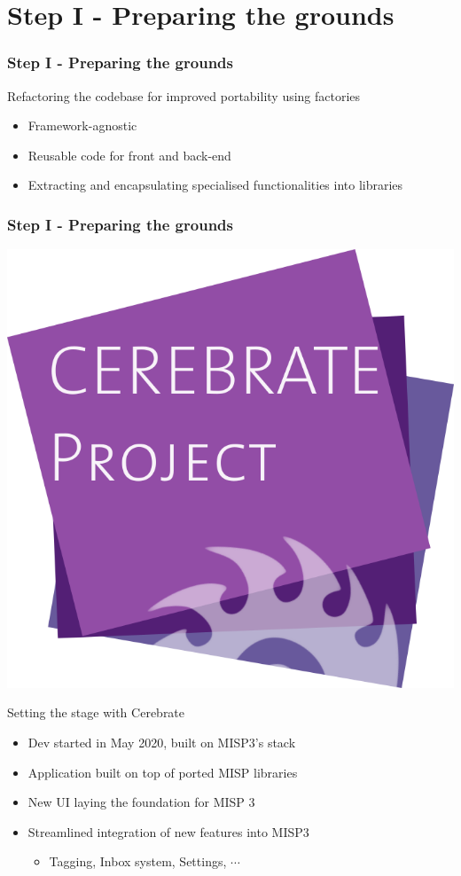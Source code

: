 \section{Step I - Preparing the grounds}
\begin{frame}
    \frametitle{Step I - Preparing the grounds}
    Refactoring the codebase for improved portability using factories
    \begin{itemize}
        \item Framework-agnostic
        \item Reusable code for front and back-end
        \item Extracting and encapsulating specialised functionalities into libraries
    \end{itemize}
\end{frame}


\begin{frame}
    \frametitle{Step I - Preparing the grounds}
    \vspace{-2em}
    \begin{center}
        \includegraphics[width=0.2\linewidth]{pictures/cerebrate.png}
    \end{center}
    Setting the stage with Cerebrate
    \begin{itemize}
        \item Dev started in May 2020, built on MISP3's stack
        \item Application built on top of ported MISP libraries
        \item New UI laying the foundation for MISP 3
        \item Streamlined integration of new features into MISP3
        \vspace{-0.5em}
        \begin{itemize}
            \item Tagging, Inbox system, Settings, $\cdots$
        \end{itemize}
    \end{itemize}
\end{frame}

